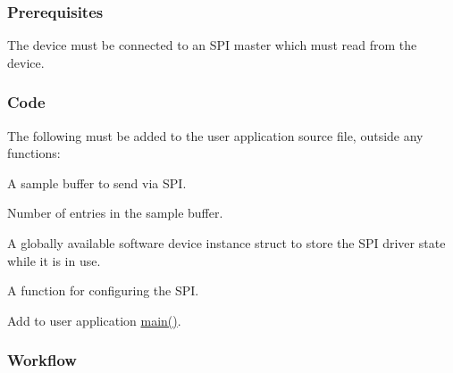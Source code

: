 \hypertarget{asfdoc_sam0_sercom_spi_slave_basic_use_asfdoc_sam0_sercom_spi_slave_basic_use_prereq}{}\subsubsection{Prerequisites}\label{asfdoc_sam0_sercom_spi_slave_basic_use_asfdoc_sam0_sercom_spi_slave_basic_use_prereq}
The device must be connected to an S\+PI master which must read from the device.\hypertarget{asfdoc_sam0_sercom_spi_slave_basic_use_asfdoc_sam0_sercom_spi_slave_basic_use_setup_code}{}\subsubsection{Code}\label{asfdoc_sam0_sercom_spi_slave_basic_use_asfdoc_sam0_sercom_spi_slave_basic_use_setup_code}
The following must be added to the user application source file, outside any functions\+:

A sample buffer to send via S\+PI. 
\begin{DoxyCodeInclude}{0}
\end{DoxyCodeInclude}
Number of entries in the sample buffer. 
\begin{DoxyCodeInclude}{0}
\end{DoxyCodeInclude}
A globally available software device instance struct to store the S\+PI driver state while it is in use. 
\begin{DoxyCodeInclude}{0}
\end{DoxyCodeInclude}
A function for configuring the S\+PI. 
\begin{DoxyCodeInclude}{0}
\end{DoxyCodeInclude}
 Add to user application {\ttfamily \mbox{\hyperlink{csc__app_8c_a840291bc02cba5474a4cb46a9b9566fe}{main()}}}. 
\begin{DoxyCodeInclude}{0}
\end{DoxyCodeInclude}
 \hypertarget{asfdoc_sam0_sercom_spi_slave_basic_use_asfdoc_sam0_sercom_spi_slave_basic_use_workflow}{}\subsubsection{Workflow}\label{asfdoc_sam0_sercom_spi_slave_basic_use_asfdoc_sam0_sercom_spi_slave_basic_use_workflow}


